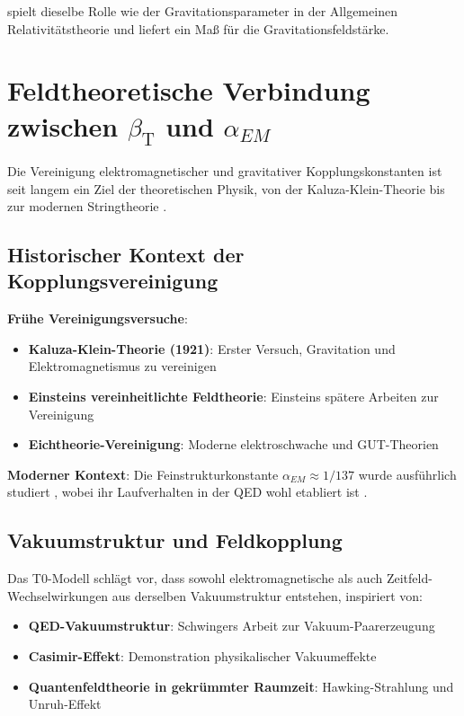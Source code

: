 \documentclass[12pt,a4paper]{article}
\newcommand{\betaT}{\beta_{\text{T}}}
\begin{document}
	spielt dieselbe Rolle wie der Gravitationsparameter in der Allgemeinen Relativitätstheorie \citep{weinberg1972} und liefert ein Maß für die Gravitationsfeldstärke.
	
	\section{Feldtheoretische Verbindung zwischen $\betaT$ und $\alpha_{EM}$}
	\label{sec:beta_alpha_connection}
	
	Die Vereinigung elektromagnetischer und gravitativer Kopplungskonstanten ist seit langem ein Ziel der theoretischen Physik, von der Kaluza-Klein-Theorie \citep{kaluza1921,klein1926} bis zur modernen Stringtheorie \citep{green1987,polchinski1998}.
	
	\subsection{Historischer Kontext der Kopplungsvereinigung}
	\label{subsec:coupling_unification_history}
	
	\textbf{Frühe Vereinigungsversuche}:
	\begin{itemize}
		\item \textbf{Kaluza-Klein-Theorie (1921)}: Erster Versuch, Gravitation und Elektromagnetismus zu vereinigen \citep{kaluza1921,klein1926}
		\item \textbf{Einsteins vereinheitlichte Feldtheorie}: Einsteins spätere Arbeiten zur Vereinigung \citep{einstein1955}
		\item \textbf{Eichtheorie-Vereinigung}: Moderne elektroschwache \citep{weinberg1967,salam1968} und GUT-Theorien \citep{georgi1974}
	\end{itemize}
	
	\textbf{Moderner Kontext}:
	Die Feinstrukturkonstante $\alpha_{EM} \approx 1/137$ wurde ausführlich studiert \citep{sommerfeld1916,feynman1985}, wobei ihr Laufverhalten in der QED wohl etabliert ist \citep{peskin1995}.
	
	\subsection{Vakuumstruktur und Feldkopplung}
	\label{subsec:vacuum_structure}
	
	Das T0-Modell schlägt vor, dass sowohl elektromagnetische als auch Zeitfeld-Wechselwirkungen aus derselben Vakuumstruktur entstehen, inspiriert von:
	\begin{itemize}
		\item \textbf{QED-Vakuumstruktur}: Schwingers Arbeit zur Vakuum-Paarerzeugung \citep{schwinger1951}
		\item \textbf{Casimir-Effekt}: Demonstration physikalischer Vakuumeffekte \citep{casimir1948}
		\item \textbf{Quantenfeldtheorie in gekrümmter Raumzeit}: Hawking-Strahlung \citep{hawking1975} und Unruh-Effekt \citep{unruh1976}
	\end{itemize}
	
\end{document}
